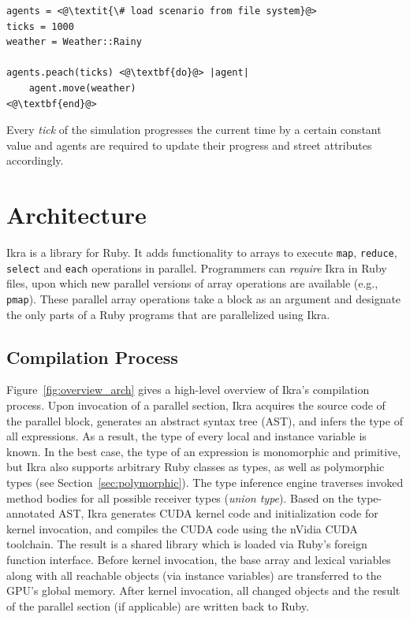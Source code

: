 \documentclass[preprint]{sigplanconf}
\begin{document}
\begin{lstlisting}
agents = <@\textit{\# load scenario from file system}@>
ticks = 1000
weather = Weather::Rainy

agents.peach(ticks) <@\textbf{do}@> |agent|
    agent.move(weather)
<@\textbf{end}@>
\end{lstlisting}

Every \emph{tick} of the simulation progresses the current time by a certain constant value and agents are required to update their progress and street attributes accordingly.

\section{Architecture}
Ikra is a library for Ruby. It adds functionality to arrays to execute \texttt{map}, \texttt{reduce}, \texttt{select} and \texttt{each} operations in parallel. Programmers can \emph{require} Ikra in Ruby files, upon which new parallel versions of array operations are available (e.g., \texttt{pmap}). These parallel array operations take a block as an argument and designate the only parts of a Ruby programs that are parallelized using Ikra.

\subsection{Compilation Process}
Figure~\ref{fig:overview_arch} gives a high-level overview of Ikra's compilation process. Upon invocation of a parallel section, Ikra acquires the source code of the parallel block, generates an abstract syntax tree (AST), and infers the type of all expressions. As a result, the type of every local and instance variable is known. In the best case, the type of an expression is monomorphic and primitive, but Ikra also supports arbitrary Ruby classes as types, as well as polymorphic types (see Section~\ref{sec:polymorphic}). The type inference engine traverses invoked method bodies for all possible receiver types (\emph{union type}). Based on the type-annotated AST, Ikra generates CUDA kernel code and initialization code for kernel invocation, and compiles the CUDA code using the nVidia CUDA toolchain. The result is a shared library which is loaded via Ruby's foreign function interface. Before kernel invocation, the base array and lexical variables along with all reachable objects (via instance variables) are transferred to the GPU's global memory. After kernel invocation, all changed objects and the result of the parallel section (if applicable) are written back to Ruby.
\end{document}
